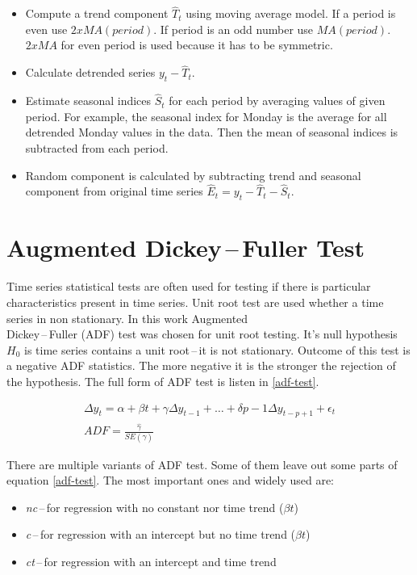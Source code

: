     \begin{itemize}
        \item Compute a trend component $\hat{T}_t$ using moving average model. If a period is even use
        $2 x MA(period)$. If period is an odd number use $MA(period)$. $2 x MA$ for even period is used because it
        has to be symmetric.
        \item Calculate detrended series $y_t - \hat{T}_t$.
        \item Estimate seasonal indices $\hat{S}_t$ for each period by averaging values of given period. For example,
         the seasonal index for Monday is the average for all detrended Monday values in the data. Then the mean of
         seasonal indices is subtracted from each period.
        \item Random component is calculated by subtracting trend and seasonal component from original time series
            $\hat{E}_t = y_t - \hat{T}_t - \hat{S}_t$.
    \end{itemize}

    \section{Augmented Dickey\,--\,Fuller Test}
    Time series statistical tests are often used for testing if there is particular characteristics present in time
    series. Unit root test are used whether a time series in non stationary. In this work Augmented \\Dickey\,--\,Fuller
    (ADF) test was chosen for unit root testing. It's null hypothesis $H_0$ is time series contains a
    unit root\,--\,it is not stationary. Outcome of this test is a negative ADF statistics. The more negative it is
    the stronger the rejection of the hypothesis. The full form of ADF test is listen in \ref{adf-test}.

    \begin{gather} \label{adf-test}
        \Delta y_t = \alpha + \beta t + \gamma \Delta y_{t-1} + \dots + \delta{p-1} \Delta y_{t-p+1} + \epsilon_t \\
        ADF = \frac{\hat{\gamma}}{SE(\hat{\gamma})} \label{adf-stat}
    \end{gather}

\newpage

    There are multiple variants of ADF test. Some of them leave out some parts of equation \ref{adf-test}.
    The most important ones and widely used are:

    \begin{itemize}
        \item \emph{nc}\,--\,for regression with no constant nor time trend ($\beta t$)
        \item \emph{c}\,--\,for regression with an intercept but no time trend ($\beta t$)
        \item \emph{ct}\,--\,for regression with an intercept and time trend
    \end{itemize}

